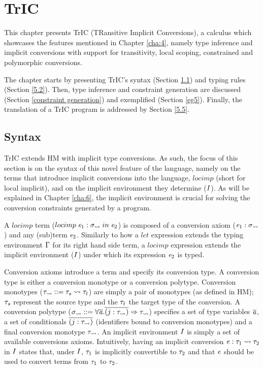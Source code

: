\chapter{TrIC}
\label{cha:5}
This chapter presents TrIC (TRansitive Implicit Conversions), a calculus which showcases the features mentioned in Chapter \ref{cha:4}, namely type inference and implicit conversions with support for transitivity, local scoping, constrained and polymorphic conversions.

The chapter starts by presenting TrIC's syntax (Section \ref{5.1}) and typing rules (Section \ref{5.2}). Then, type inference and constraint generation are discussed (Section \ref{constraint generation}) and exemplified (Section \ref{eg5}). Finally, the translation of a TrIC program is addressed by Section \ref{5.5}.
\section{Syntax}
\label{5.1}
TrIC extends HM with implicit type conversions. As such, the focus of this section is on the syntax of this novel feature of the language, namely on the terms that introduce implicit conversions into the language, $locimp$ (short for local implicit), and on the implicit environment they determine ($I$). As will be explained in Chapter \ref{cha:6}, the implicit environment is crucial for solving the conversion constraints generated by a program.

A $locimp$ term ($locimp \; \mathit{e}_1:\mathit{\sigma}_{\rightsquigarrow}\; in\; \mathit{e}_2$) is composed of a conversion axiom ($\mathit{e}_1: \mathit{\sigma}_{\rightsquigarrow}$) and any (sub)term $\mathit{e}_2$. Similarly to how a $let$ expression extends the typing environment $\Gamma$ for its right hand side term, a $locimp$ expression extends the implicit environment ($I$) under which its expression $\mathit{e}_2$ is typed. 

Conversion axioms introduce a term and specify its conversion type. A conversion type is either a conversion monotype or a conversion polytype. Conversion monotypes ($\mathit{\tau_{\rightsquigarrow}}::=\mathit{\tau}_s \rightsquigarrow \mathit{\tau}_t$) are simply a pair of monotypes (as defined in HM); $\mathit{\tau}_s$ represent the source type and the $\mathit{\tau}_t$ the target type of the conversion. A conversion polytype ($\mathit{\sigma_{\rightsquigarrow}}::=\forall \overline {\mathit{a}} . \overline{(j : \mathit{\tau}_{\rightsquigarrow})} \Rightarrow \mathit{\tau}_{\rightsquigarrow}$) specifies a set of type variables $\overline {\mathit{a}}$, a set of conditionals $\overline{(j : \mathit{\tau}_{\rightsquigarrow})}$ (identifiers bound to conversion monotypes) and a final conversion monotype $\mathit{\tau}_{\rightsquigarrow}$. 
An implicit environment $I$ is simply a set of available conversions axioms. Intuitively, having an implicit conversion $\mathit{e}: \mathit{\tau}_1 \rightsquigarrow \mathit{\tau}_2$ in $I$ states that, under $I$, $\mathit{\tau}_1$ is implicitly convertible to $\mathit{\tau}_2$ and that $\mathit{e}$ should be used to convert terms from $\mathit{\tau}_1$ to $\mathit{\tau}_2$.

